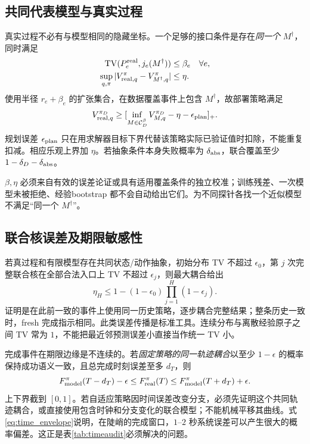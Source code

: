 \documentclass[11pt,a4paper,fontset=fandol]{ctexart}
\theoremstyle{definition}
\theoremstyle{remark}\newtheorem{remark}[theorem]{说明}
\numberwithin{equation}{section}
\newcommand{\TV}{\operatorname{TV}}\newcommand{\supp}{\operatorname{supp}}
\newcommand{\pos}[1]{[#1]_+}
\begin{document}
\subsection{共同代表模型与真实过程}
真实过程不必有与模型相同的隐藏坐标。一个足够的接口条件是存在\emph{同一个} $M^\dagger$，同时满足
\begin{align}
 \TV(P^{\rm real}_e,j_e(M^\dagger))&\le\beta_e\quad\forall e,\label{eq:beta}\\
 \sup_{q,\pi}|V_{{\rm real},q}^{\pi}-V_{M^\dagger,q}^{\pi}|&\le\eta.
 \label{eq:eta}
\end{align}
使用半径 $r_e+\beta_e$ 的扩张集合，在数据覆盖事件上包含 $M^\dagger$，故部署策略满足
\begin{equation}
 V_{{\rm real},q}^{\pi_D}\ge
 \pos{\inf_{M\in\cC_D^\beta}V_{M,q}^{\pi_D}-\eta-\epsilon_{\rm plan}}.
 \label{eq:real_lower}
\end{equation}
规划误差 $\epsilon_{\rm plan}$ 只在用求解器目标下界代替该策略实际已验证值时扣除，不能重复扣减。相应乐观上界加 $\eta$。若抽象条件本身失败概率为 $\delta_{\rm abs}$，联合覆盖至少 $1-\delta_D-\delta_{\rm abs}$。

$\beta,\eta$ 必须来自有效的误差论证或具有适用覆盖条件的独立校准；训练残差、一次模型未被拒绝、经验bootstrap 都不会自动给出它们。为不同探针各找一个近似模型不满足“同一个 $M^\dagger$”。

\subsection{联合核误差及期限敏感性}
若真过程和有限模型存在共同状态/动作抽象，初始分布 TV 不超过 $\epsilon_0$，第 $j$ 次完整联合核在全部合法入口上 TV 不超过 $\epsilon_j$，则最大耦合给出
\begin{equation}
 \eta_H\le1-(1-\epsilon_0)\prod_{j=1}^{H}(1-\epsilon_j).
 \label{eq:coupling}
\end{equation}
证明是在此前一致的事件上使用同一历史策略，逐步耦合完整结果；整条历史一致时，fresh 完成指示相同。此类误差传播是标准工具\cite{ais}。连续分布与离散经验原子之间 TV 常为 $1$，不能把最近邻预测误差小直接当作统一 TV 小。

完成事件在期限边缘是不连续的。若\emph{固定策略的同一轨迹耦合}以至少 $1-\epsilon$ 的概率保持成功语义一致，且总完成时刻误差至多 $d_T$，则
\begin{equation}
 F_{\rm model}^{\pi}(T-d_T)-\epsilon
 \le F_{\rm real}^{\pi}(T)
 \le F_{\rm model}^{\pi}(T+d_T)+\epsilon.
 \label{eq:time_envelope}
\end{equation}
上下界截到 $[0,1]$。若自适应策略因时间误差改变分支，必须先证明这个共同轨迹耦合，或直接使用包含时钟和分支变化的联合模型；不能机械平移其曲线。式\eqref{eq:time_envelope}说明，在陡峭的完成窗口，$1$--$2$ 秒系统误差可以产生很大的概率偏差。这正是表\ref{tab:timeaudit}必须解决的问题。
\end{document}

